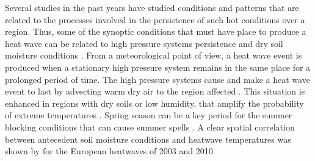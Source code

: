 Several studies in the past
years have studied conditions and patterns that are related to the
processes involved in the persistence of such hot conditions over a region.
Thus, some of the synoptic conditions that must have place to produce  a heat wave can be related to high pressure systems persistence and dry soil moisture 
conditions \cite{del_al2007, fis_al2007, cou_rah2012, lau_nat2012, bru_al2018, sch_al2018}. From a meteorological point of view, 
a heat wave event is produced when a stationary high pressure system  remains in the same place for a prolonged period of time. The high 
pressure systems cause and make a heat wave event to last by advecting 
warm dry air to the region affected \cite{per2015}. This situation is 
enhanced in regions with dry soils or low humidity, that amplify the 
probability of extreme temperatures \cite{sil_al2017}. Spring season can be a key period for the summer blocking conditions that can cause 
summer spells \cite{bru_al2017}. A clear spatial 
correlation between antecedent soil moisture conditions and 
heatwave temperatures was shown by \cite{sil_al2017} for the European heatwaves of 2003 and 2010.

